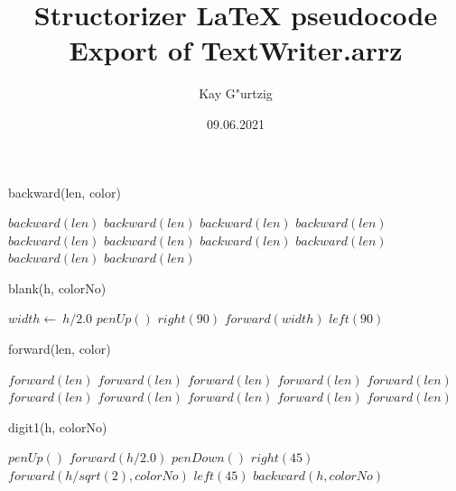 \documentclass[a4paper,10pt]{article}
\title{Structorizer LaTeX pseudocode Export of TextWriter.arrz}
\author{Kay G"urtzig}
\date{09.06.2021}
\begin{document}
\begin{algorithm}
\caption{backward(len, color)}
\begin{algorithmic}[5]

    \STATE \(backward(len)\)
    \STATE \(backward(len)\)
    \STATE \(backward(len)\)
    \STATE \(backward(len)\)
    \STATE \(backward(len)\)
    \STATE \(backward(len)\)
    \STATE \(backward(len)\)
    \STATE \(backward(len)\)
    \STATE \(backward(len)\)
    \STATE \(backward(len)\)
  \ENDIF

\end{algorithmic}
\end{algorithm}


\begin{algorithm}
\caption{blank(h, colorNo)}
\begin{algorithmic}[5]

\STATE {}
  \STATE \(width\gets\ h/2.0\)
  \STATE \(penUp()\)
  \STATE \(right(90)\)
  \STATE \(forward(width)\)
  \STATE \(left(90)\)

\end{algorithmic}
\end{algorithm}


\begin{algorithm}
\caption{forward(len, color)}
\begin{algorithmic}[5]

    \STATE \(forward(len)\)
    \STATE \(forward(len)\)
    \STATE \(forward(len)\)
    \STATE \(forward(len)\)
    \STATE \(forward(len)\)
    \STATE \(forward(len)\)
    \STATE \(forward(len)\)
    \STATE \(forward(len)\)
    \STATE \(forward(len)\)
    \STATE \(forward(len)\)
  \ENDIF

\end{algorithmic}
\end{algorithm}


\begin{algorithm}
\caption{digit1(h, colorNo)}
\begin{algorithmic}[5]

\STATE {}
\STATE {}
  \STATE \(penUp()\)
  \STATE \(forward(h/2.0)\)
  \STATE \(penDown()\)
  \STATE \(right(45)\)
  \STATE \(forward(h/sqrt(2),colorNo)\)
  \STATE \(left(45)\)
  \STATE \(backward(h,colorNo)\)

\end{algorithmic}
\end{algorithm}
\end{document}
